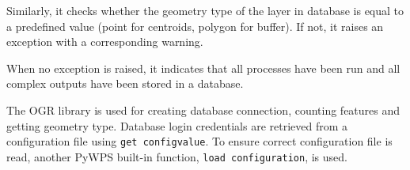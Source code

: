 Similarly, it checks whether the geometry type of the layer in
database is equal to a predefined value (point for centroids, polygon
for buffer). If not, it raises an exception with a corresponding
warning.

When no exception is raised, it indicates that all processes have been
run and all complex outputs have been stored in a database.

The OGR library is used for creating database connection, counting
features and getting geometry type. Database login credentials are
retrieved from a configuration file using \texttt{get\textunderscore
  config\textunderscore value}. To ensure correct configuration file
is read, another PyWPS built-in function, \texttt{load\textunderscore
  configuration}, is used.


